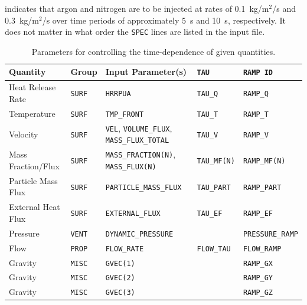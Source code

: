\documentclass[11pt]{book}
\newcommand{\ct}{\tt\small}
\begin{document}
\noindent
indicates that argon and nitrogen are to be injected at rates of 0.1~kg/m$^2$/s and 0.3~kg/m$^2$/s over time periods of approximately 5~s and 10~s, respectively. It does not
matter in what order the {\ct SPEC} lines are listed in the input file.


\begin{table}[ht]
\label{tau_table}
\caption[Parameters used to control time-dependence]{Parameters for controlling the time-dependence of given quantities.}
\begin{tabular}{|l|l|l|l|l|}
\hline
Quantity            & Group             & Input Parameter(s)                                            & {\ct TAU}                         & {\ct RAMP ID}              \\ \hline \hline
Heat Release Rate   & {\ct SURF}        & {\ct HRRPUA}                                                  & {\ct TAU\_Q}                      & {\ct RAMP\_Q}              \\ \hline
Temperature         & {\ct SURF}        & {\ct TMP\_FRONT}                                              & {\ct TAU\_T}                      & {\ct RAMP\_T}              \\ \hline
Velocity            & {\ct SURF}        & {\ct VEL}, {\ct VOLUME\_FLUX}, {\ct MASS\_FLUX\_TOTAL}        & {\ct TAU\_V}                      & {\ct RAMP\_V}              \\ \hline
Mass Fraction/Flux  & {\ct SURF}        & {\ct MASS\_FRACTION(N)}, {\ct MASS\_FLUX(N)}                  & {\ct TAU\_MF(N)}                  & {\ct RAMP\_MF(N)}          \\ \hline
Particle Mass Flux  & {\ct SURF}        & {\ct PARTICLE\_MASS\_FLUX}                                    & {\ct TAU\_PART}                   & {\ct RAMP\_PART}           \\ \hline
External Heat Flux  & {\ct SURF}        & {\ct EXTERNAL\_FLUX}                                          & {\ct TAU\_EF}                     & {\ct RAMP\_EF}             \\ \hline
Pressure            & {\ct VENT}        & {\ct DYNAMIC\_PRESSURE}                                       &                                   & {\ct PRESSURE\_RAMP}       \\ \hline
Flow                & {\ct PROP}        & {\ct FLOW\_RATE}                                              & {\ct FLOW\_TAU}                   & {\ct FLOW\_RAMP}           \\ \hline
Gravity             & {\ct MISC}        & {\ct GVEC(1)}                                                 &                                   & {\ct RAMP\_GX}             \\ \hline
Gravity             & {\ct MISC}        & {\ct GVEC(2)}                                                 &                                   & {\ct RAMP\_GY}             \\ \hline
Gravity             & {\ct MISC}        & {\ct GVEC(3)}                                                 &                                   & {\ct RAMP\_GZ}             \\ \hline
\end{tabular}
\end{table}
\end{document}
